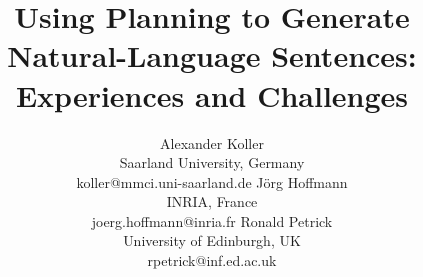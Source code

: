 \documentclass[letterpaper]{article}
\begin{document}
\title{Using Planning to Generate Natural-Language Sentences:\\
  Experiences and Challenges}

\author{
Alexander Koller \\ Saarland University, Germany \\ koller@mmci.uni-saarland.de
\And
J\"org Hoffmann \\ INRIA, France \\ joerg.hoffmann@inria.fr
\And
Ronald Petrick \\ University of Edinburgh, UK \\ rpetrick@inf.ed.ac.uk
}

\maketitle












\end{document}
